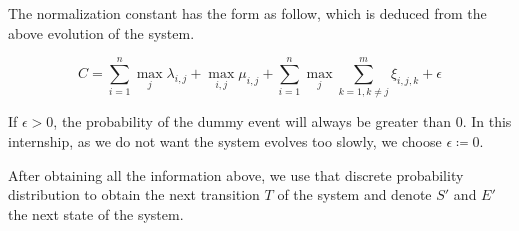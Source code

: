 \documentclass[
  a4paper, xcolor = usenames,dvipsnames]{article}
\begin{document}
The normalization constant has the form as follow, which is deduced from the above evolution of the system.

\[
C = \sum_{i = 1}^{n} \max_{j} \lambda_{i, j} + \max_{i, j} \mu_{i, j} + \sum_{i = 1}^{n} \max_{j} \sum_{k = 1, k \neq j}^{m} \xi_{i, j, k} + \epsilon
\]

If \(\epsilon > 0\), the probability of the dummy event will always be greater than 0. In this internship, as we do not want the system evolves too slowly, we choose \(\epsilon \coloneq 0\).

After obtaining all the information above, we use that discrete probability distribution to obtain the next transition \(T\) of the system and denote \(S'\) and \(E'\) the next state of the system.
\end{document}
